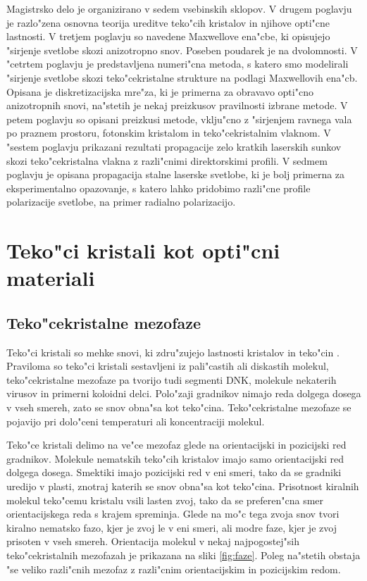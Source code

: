 \documentclass[12pt,twoside,openright,final,a4paper]{report}
\begin{document}
Magistrsko delo je organizirano v sedem vsebinskih sklopov. 
V drugem poglavju je razlo"zena osnovna teorija ureditve teko"cih kristalov in njihove opti"cne lastnosti. 
V tretjem poglavju so navedene Maxwellove ena"cbe, ki opisujejo "sirjenje svetlobe skozi anizotropno snov. 
Poseben poudarek je na dvolomnosti. 
V "cetrtem poglavju je predstavljena numeri"cna metoda, s katero smo modelirali "sirjenje svetlobe skozi teko"cekristalne strukture na podlagi Maxwellovih ena"cb. 
Opisana je diskretizacijska mre"za, ki je primerna za obravavo opti"cno anizotropnih snovi, na"stetih je nekaj preizkusov pravilnosti izbrane metode. 
V petem poglavju so opisani preizkusi metode, vklju"cno z "sirjenjem ravnega vala po praznem prostoru, fotonskim kristalom in teko"cekristalnim vlaknom. 
V "sestem poglavju prikazani rezultati propagacije zelo kratkih laserskih sunkov skozi teko"cekristalna vlakna z razli"cnimi direktorskimi profili. 
V sedmem poglavju je opisana propagacija stalne laserske svetlobe, ki je bolj primerna za eksperimentalno opazovanje, s katero lahko pridobimo razli"cne profile polarizacije svetlobe, na primer radialno polarizacijo. 


\chapter{Teko"ci kristali kot opti"cni materiali}

\section{Teko"cekristalne mezofaze}

Teko"ci kristali so mehke snovi, ki zdru"zujejo lastnosti kristalov in teko"cin \cite{degennes}. 
Praviloma so teko"ci kristali sestavljeni iz pali"castih ali diskastih molekul, teko"cekristalne mezofaze pa tvorijo tudi segmenti DNK, molekule nekaterih virusov in primerni koloidni delci. 
Polo"zaji gradnikov nimajo reda dolgega dosega v vseh smereh, zato se snov obna"sa kot teko"cina. 
Teko"cekristalne mezofaze se pojavijo pri dolo"ceni temperaturi ali koncentraciji molekul. 

Teko"ce kristali delimo na ve"ce mezofaz glede na orientacijski in pozicijski red gradnikov. 
Molekule nematskih teko"cih kristalov imajo samo orientacijski red dolgega dosega. 
Smektiki imajo pozicijski red v eni smeri, tako da se gradniki uredijo v plasti, znotraj katerih se snov obna"sa kot teko"cina. 
Prisotnost kiralnih molekul teko"cemu kristalu vsili lasten zvoj, tako da se preferen"cna smer orientacijskega reda s krajem spreminja. 
Glede na mo"c tega zvoja snov tvori kiralno nematsko fazo, kjer je zvoj le v eni smeri, ali modre faze, kjer je zvoj prisoten v vseh smereh. 
Orientacija molekul v nekaj najpogostej"sih teko"cekristalnih mezofazah je prikazana na sliki \ref{fig:faze}. 
Poleg na"stetih obstaja "se veliko razli"cnih mezofaz z razli"cnim orientacijskim in pozicijskim redom. 
\end{document}
